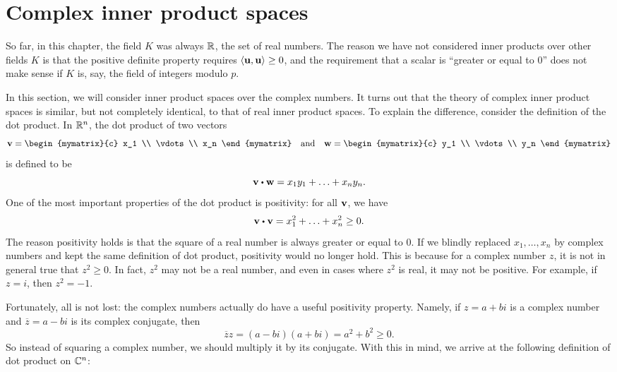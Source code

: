 \section{Complex inner product spaces}

So far, in this chapter, the field $K$ was always $\mathbb{R}$, the set of
real numbers.  The reason we have not considered inner products over
other fields $K$ is that the positive definite property requires
$\iprod{\vect{u},\vect{u}}\geq 0$, and the requirement that a scalar
is ``greater or equal to 0'' does not make sense if $K$ is, say, the
field of integers modulo $p$.

In this section, we will consider inner product spaces over the
complex numbers. It turns out that the theory of complex inner product
spaces is similar, but not completely identical, to that of real inner
product spaces. To explain the difference, consider the definition of
the dot product. In $\mathbb{R}^n$, the dot product of two vectors
\begin{equation*}
  \vect{v}=\begin{mymatrix}{c} x_1 \\ \vdots \\ x_n \end{mymatrix}
  \quad\mbox{and}\quad
  \vect{w}=\begin{mymatrix}{c} y_1 \\ \vdots \\ y_n \end{mymatrix}
\end{equation*}
is defined to be
\begin{equation*}
  \vect{v}\dotprod \vect{w} = x_1y_1 + \ldots + x_ny_n.
\end{equation*}
One of the most important properties of the dot product is positivity:
for all $\vect{v}$, we have
\begin{equation*}
  \vect{v}\dotprod\vect{v} = x_1^2 + \ldots + x_n^2\geq 0.
\end{equation*}
The reason positivity holds is that the square of a real number is
always greater or equal to 0. If we blindly replaced $x_1,\ldots,x_n$
by complex numbers and kept the same definition of dot product,
positivity would no longer hold. This is because for a complex number
$z$, it is not in general true that $z^2\geq 0$. In fact, $z^2$ may
not be a real number, and even in cases where $z^2$ is real, it may
not be positive. For example, if $z=i$, then $z^2=-1$.

Fortunately, all is not lost: the complex numbers actually do have a
useful positivity property. Namely, if $z=a+bi$ is a complex number
and $\overline{z}=a-bi$ is its complex conjugate, then
\begin{equation*}
  \overline{z}z = (a-bi)(a+bi) = a^2 + b^2 \geq 0.
\end{equation*}
So instead of squaring a complex number, we should multiply it by its
conjugate. With this in mind, we arrive at the following definition of
dot product on $\mathbb{C}^n$:

